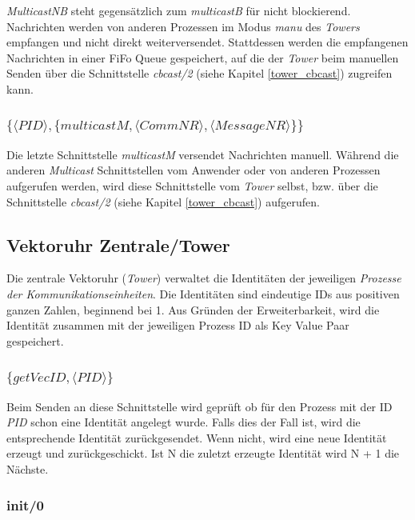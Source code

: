 \textit{MulticastNB} steht gegensätzlich zum \textit{multicastB} für nicht blockierend. Nachrichten werden von anderen Prozessen im Modus \textit{manu} des \textit{Towers} empfangen und nicht direkt weiterversendet. Stattdessen werden die empfangenen Nachrichten in einer FiFo Queue gespeichert, auf die der \textit{Tower} beim manuellen Senden über die Schnittstelle \textit{cbcast/2} (siehe Kapitel \ref{tower_cbcast}) zugreifen kann.

\subsubsection{$\{\langle PID\rangle,\{multicastM,\langle CommNR\rangle,\langle MessageNR\rangle\}\}$}

Die letzte Schnittstelle \textit{multicastM} versendet Nachrichten manuell. Während die anderen \textit{Multicast} Schnittstellen vom Anwender oder von anderen Prozessen aufgerufen werden, wird diese Schnittstelle vom \textit{Tower} selbst, bzw. über die Schnittstelle \textit{cbcast/2} (siehe Kapitel \ref{tower_cbcast}) aufgerufen.

\subsection{Vektoruhr Zentrale/Tower} \label{tower}

Die zentrale Vektoruhr (\textit{Tower}) verwaltet die Identitäten der jeweiligen \textit{Prozesse der Kommunikationseinheiten}. Die Identitäten sind eindeutige IDs aus positiven ganzen Zahlen, beginnend bei 1.
Aus Gründen der Erweiterbarkeit, wird die Identität zusammen mit der jeweiligen Prozess ID als Key Value Paar gespeichert.

\subsubsection{$\{getVecID,\langle PID\rangle\}$}

Beim Senden an diese Schnittstelle wird geprüft ob für den Prozess mit der ID \textit{PID} schon eine Identität angelegt wurde. Falls dies der Fall ist, wird die entsprechende Identität zurückgesendet. Wenn nicht, wird eine neue Identität erzeugt und zurückgeschickt. Ist N die zuletzt erzeugte Identität wird N + 1 die Nächste.

\subsubsection{init/0}

